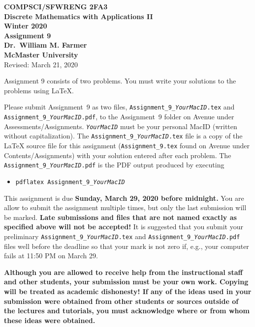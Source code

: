 \documentclass[11pt,fleqn]{article}
\begin{document}
\begin{center}

  {\large \textbf{COMPSCI/SFWRENG 2FA3}}\\[2mm]
  {\large \textbf{Discrete Mathematics with Applications II}}\\[2mm]
  {\large \textbf{Winter 2020}}\\[8mm]
  {\huge \textbf{Assignment 9}}\\[6mm]
  {\large \textbf{Dr.~William M. Farmer}}\\[2mm]
  {\large \textbf{McMaster University}}\\[6mm]
  {\large Revised: March 21, 2020}

\end{center}

\medskip

Assignment 9 consists of two problems.  You must write your solutions
to the problems using LaTeX.

Please submit Assignment~9 as two files,
\texttt{Assignment\_9\_\emph{YourMacID}.tex} and
\texttt{Assignment\_9\_\emph{YourMacID}.pdf}, to the Assignment~9
folder on Avenue under Assessments/Assignments.
\texttt{\emph{YourMacID}} must be your personal MacID (written without
capitalization).  The \texttt{Assignment\_9\_\emph{YourMacID}.tex}
file is a copy of the LaTeX source file for this assignment
(\texttt{Assignment\_9.tex} found on Avenue under
Contents/Assignments) with your solution entered after each problem.
The \texttt{Assignment\_9\_\emph{YourMacID}.pdf} is the PDF output
produced by executing

\begin{itemize}

  \item[] \texttt{pdflatex Assignment\_9\_\emph{YourMacID}}

\end{itemize}

This assignment is due \textbf{Sunday, March 29, 2020 before
  midnight.}  You are allow to submit the assignment multiple times,
but only the last submission will be marked.  \textbf{Late submissions
  and files that are not named exactly as specified above will not be
  accepted!}  It is suggested that you submit your preliminary
\texttt{Assignment\_9\_\emph{YourMacID}.tex} and
\texttt{Assignment\_9\_\emph{YourMacID}.pdf} files well before the
deadline so that your mark is not zero if, e.g., your computer fails
at 11:50 PM on March 29.

\textbf{Although you are allowed to receive help from the
  instructional staff and other students, your submission must be your
  own work.  Copying will be treated as academic dishonesty! If any of
  the ideas used in your submission were obtained from other students
  or sources outside of the lectures and tutorials, you must
  acknowledge where or from whom these ideas were obtained.}
\end{document}
